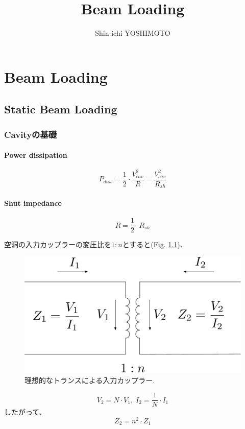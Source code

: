 \documentclass[book]{jlreq}
\begin{document}
\title{Beam Loading}
\author{Shin-ichi YOSHIMOTO}
\maketitle
\tableofcontents

\part{Beam Loading}
\chapter{Static Beam Loading}
\section{Cavityの基礎}
\subsection{Power dissipation}
\begin{equation}
    P_{diss} = \frac{1}{2} \cdot \frac{V_{cav}^2}{R} = \frac{V_{cav}^2}{R_{sh}}
\end{equation}

\subsection{Shut impedance}
\begin{equation}
    R = \frac{1}{2}\cdot R_{sh}
\end{equation}

空洞の入力カップラーの変圧比を$1:n$とすると(Fig. \ref{fig:Ideal_Trans})、
%
\begin{figure}[hbt]
    \begin{center}
        \includegraphics[width=12cm,clip]{figs/Ideal_Transformer.pdf}
        \caption{理想的なトランスによる入力カップラー.}
        \label{fig:Ideal_Trans}
    \end{center}
\end{figure}
%
\begin{equation}
    V_2 = N\cdot V_1, \; I_2 = \frac{1}{N}\cdot I_1
\end{equation}
%
したがって、
\begin{equation}
    Z_2 = n^2 \cdot Z_1
\end{equation}
\end{document}
